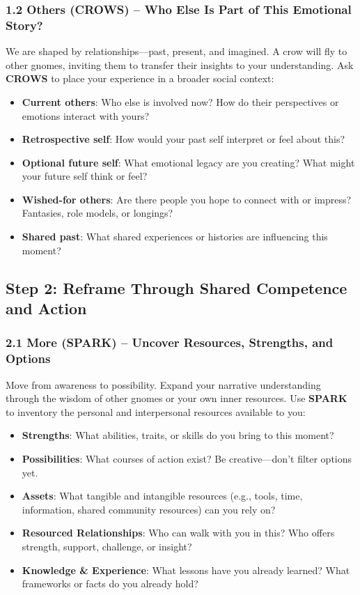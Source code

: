 \documentclass{article}
\begin{document}
\subsubsection{1.2 Others (CROWS) – Who Else Is Part of This Emotional Story?}
We are shaped by relationships—past, present, and imagined. A crow will fly to other gnomes, inviting them to transfer their insights to your understanding. Ask \textbf{CROWS} to place your experience in a broader social context:
\begin{itemize}[noitemsep,topsep=0pt]
    \item \textbf{Current others}: Who else is involved now? How do their perspectives or emotions interact with yours?
    \item \textbf{Retrospective self}: How would your past self interpret or feel about this?
    \item \textbf{Optional future self}: What emotional legacy are you creating? What might your future self think or feel?
    \item \textbf{Wished-for others}: Are there people you hope to connect with or impress? Fantasies, role models, or longings?
    \item \textbf{Shared past}: What shared experiences or histories are influencing this moment?
\end{itemize}

\subsection{Step 2: Reframe Through Shared Competence and Action}

\subsubsection{2.1 More (SPARK) – Uncover Resources, Strengths, and Options}
Move from awareness to possibility. Expand your narrative understanding through the wisdom of other gnomes or your own inner resources. Use \textbf{SPARK} to inventory the personal and interpersonal resources available to you:
\begin{itemize}[noitemsep,topsep=0pt]
    \item \textbf{Strengths}: What abilities, traits, or skills do you bring to this moment?
    \item \textbf{Possibilities}: What courses of action exist? Be creative—don't filter options yet.
    \item \textbf{Assets}: What tangible and intangible resources (e.g., tools, time, information, shared community resources) can you rely on?
    \item \textbf{Resourced Relationships}: Who can walk with you in this? Who offers strength, support, challenge, or insight?
    \item \textbf{Knowledge \& Experience}: What lessons have you already learned? What frameworks or facts do you already hold?
\end{itemize}
\end{document}
